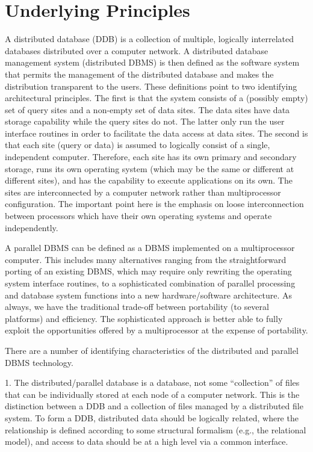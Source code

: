 \documentclass{article}
\begin{document}
\section{Underlying Principles}
A distributed database (DDB) is a collection of multiple, logically interrelated databases distributed over a computer network. A distributed database management system (distributed DBMS) is then defined as the software system that permits the management of the distributed database and makes the distribution transparent to the users. These definitions point to two identifying architectural principles. The first is that the system consists of a (possibly empty) set of query sites and a non-empty set of data sites. The data sites have data storage capability while the query sites do not. The latter only run the user interface routines in order to facilitate the data access at data sites. The second is that each site (query or data) is assumed to logically consist of a single, independent computer. Therefore, each site has its own primary and secondary storage, runs its own operating system (which may be the same or different at different sites), and has the capability to execute applications on its own. The sites are
interconnected by a computer network rather than multiprocessor configuration. The important point here is the emphasis on loose interconnection between processors which have their own operating systems and operate independently.

A parallel DBMS can be defined as a DBMS implemented on a multiprocessor computer. This includes many alternatives ranging from the straightforward porting of an existing DBMS, which may require only rewriting the operating system interface routines, to a sophisticated combination of parallel processing and database system functions into a new hardware/software architecture. As always, we have the traditional trade-off between portability (to several platforms) and efficiency. The sophisticated approach is better able to fully exploit the opportunities offered by a multiprocessor at the expense of portability.

There are a number of identifying characteristics of the distributed and parallel DBMS technology.

1. The distributed/parallel database is a database, not some “collection” of files that can be individually stored at each node of a computer network. This is the distinction between a DDB and a collection of files managed by a distributed file system. To form a DDB, distributed data should be logically related, where the relationship is defined according to some structural formalism (e.g., the relational model), and access to data should be at a high level via a common interface.
\end{document}
